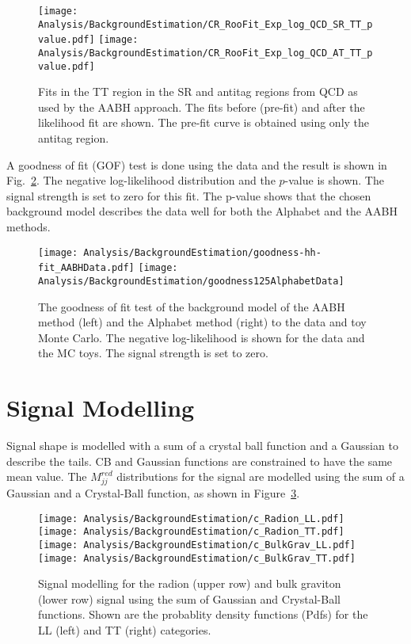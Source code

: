 \begin{figure}[H]
\centering
\texttt{[image: Analysis/BackgroundEstimation/CR\_RooFit\_Exp\_log\_QCD\_SR\_TT\_pvalue.pdf]}
\texttt{[image: Analysis/BackgroundEstimation/CR\_RooFit\_Exp\_log\_QCD\_AT\_TT\_pvalue.pdf]}
\caption{Fits in the TT region in the SR and antitag regions from QCD as used by the AABH approach. The fits before (pre-fit) and after the likelihood fit are shown. The pre-fit curve is obtained using only the antitag region.}
\label{fig:MCaabhTT}
\end{figure}

A goodness of fit (GOF) test is done using the data and the result is shown in Fig.~\ref{fig:gof_data}. The negative log-likelihood distribution and the $p$-value is shown. The signal strength is set to zero for this fit. The p-value shows that the chosen background model describes the data well for both the Alphabet and the AABH methods.

\begin{figure}[H]
\centering
\texttt{[image: Analysis/BackgroundEstimation/goodness-hh-fit\_AABHData.pdf]}
\texttt{[image: Analysis/BackgroundEstimation/goodness125AlphabetData]}
  \caption{The goodness of fit test of the background model of the AABH method (left) and the Alphabet method (right) to the data and toy Monte Carlo. The negative log-likelihood is shown for the data and the MC toys. The signal strength is set to zero.}
\label{fig:gof_data}
\end{figure}


\section{Signal Modelling}
\label{sec:SignalModel}

Signal shape is modelled with a sum of a crystal ball function and a Gaussian to describe the tails. CB and Gaussian functions are constrained to have the same mean value. The $M_{jj}^{red}$ distributions for the signal are modelled using the sum of a Gaussian and a Crystal-Ball function, as shown in Figure~\ref{fig:sigfit}.

\begin{figure}[H]
\centering
\texttt{[image: Analysis/BackgroundEstimation/c\_Radion\_LL.pdf]}
\texttt{[image: Analysis/BackgroundEstimation/c\_Radion\_TT.pdf]}
\texttt{[image: Analysis/BackgroundEstimation/c\_BulkGrav\_LL.pdf]}
\texttt{[image: Analysis/BackgroundEstimation/c\_BulkGrav\_TT.pdf]}
\caption{Signal modelling for the radion (upper row) and bulk graviton (lower row) signal using the sum of Gaussian and Crystal-Ball functions. Shown are the probablity density functions (Pdfs) for the LL (left) and TT (right) categories.}
\label{fig:sigfit}
\end{figure}

